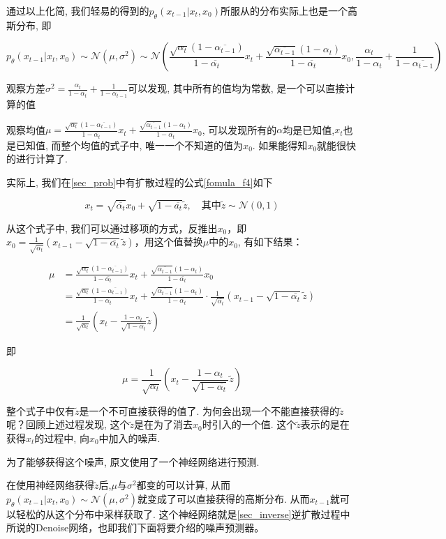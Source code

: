 通过以上化简, 我们轻易的得到的$p_\theta(x_{t-1}|x_t,x_0)$所服从的分布实际上也是一个高斯分布, 即

$$p_\theta(x_{t-1}|x_t,x_0)\sim\mathcal{N}(\mu,\sigma^2)\sim\mathcal{N}\left(\frac{\sqrt{\alpha_t}(1-\overline{\alpha_{t-1}})}{1-\overline{\alpha_t}}x_t+\frac{\sqrt{\overline{\alpha_{t-1}}}\left(1-\alpha_t\right)}{1-\overline{\alpha_t}}x_0, \frac{\alpha_t}{1-\alpha_t}+\frac{1}{1-\overline{\alpha_{t-1}}}\right)$$

观察方差$\sigma^2=\frac{\alpha_t}{1-\alpha_t}+\frac{1}{1-\overline{\alpha_{t-1}}}$可以发现, 其中所有的值均为常数, 是一个可以直接计算的值

观察均值$\mu=\frac{\sqrt{\alpha_t}(1-\overline{\alpha_{t-1}})}{1-\overline{\alpha_t}}x_t+\frac{\sqrt{\overline{\alpha_{t-1}}}\left(1-\alpha_t\right)}{1-\overline{\alpha_t}}x_0$, 可以发现所有的$\alpha$均是已知值,$x_t$也是已知值, 而整个均值的式子中, 唯一一个不知道的值为$x_0$. 如果能得知$x_0$就能很快的进行计算了.

实际上, 我们在\ref{sec_prob}中有扩散过程的公式\ref{fomula_f4}如下

$$x_t=\sqrt{\overline{\alpha_t}}x_0 + \sqrt{1-\overline{a_t}}\widetilde{z},\quad \text{其中}\widetilde{z}\sim\mathcal{N}(0,1)$$

从这个式子中, 我们可以通过移项的方式，反推出$x_0$，即$x_0 = \frac{1}{\sqrt{\overline{\alpha_t}}}\left(x_{t-1}-\sqrt{1-\overline{\alpha_t}}\widetilde{z}\right)$，用这个值替换$\mu$中的$x_0$, 有如下结果：


\begin{equation}
\begin{aligned}
\mu&=\frac{\sqrt{\alpha_t}(1-\overline{\alpha_{t-1}})}{1-\overline{\alpha_t}}x_t+\frac{\sqrt{\overline{\alpha_{t-1}}}\left(1-\alpha_t\right)}{1-\overline{\alpha_t}}x_0\\
&=\frac{\sqrt{\alpha_t}(1-\overline{\alpha_{t-1}})}{1-\overline{\alpha_t}}x_t+\frac{\sqrt{\overline{\alpha_{t-1}}}\left(1-\alpha_t\right)}{1-\overline{\alpha_t}}\cdot\frac{1}{\sqrt{\overline{\alpha_t}}}\left(x_{t-1}-\sqrt{1-\overline{\alpha_t}}\widetilde{z}\right)\\
&=\frac{1}{\sqrt{\alpha_t}}\left( x_t-\frac{1-\alpha_t}{\sqrt{1-\overline{\alpha_t}}}\widetilde{z} \right)
\end{aligned}
\end{equation}


即

$$
\mu=\frac{1}{\sqrt{\alpha_t}}\left( x_t-\frac{1-\alpha_t}{\sqrt{1-\overline{\alpha_t}}}\widetilde{z} \right)
$$

整个式子中仅有$\widetilde{z}$是一个不可直接获得的值了. 为何会出现一个不能直接获得的$\widetilde{z}$呢？回顾上述过程发现, 这个$\widetilde{z}$是在为了消去$x_0$时引入的一个值. 这个$\widetilde{z}$表示的是在获得$x_t$的过程中,  向$x_0$中加入的噪声. 

为了能够获得这个噪声, 原文使用了一个神经网络进行预测.

在使用神经网络获得$\widetilde{z}$后,$\mu$与$\sigma^2$都变的可以计算, 从而$p_\theta(x_{t-1}|x_t,x_0)\sim \mathcal{N}(\mu, \sigma^2)$就变成了可以直接获得的高斯分布. 从而$x_{t-1}$就可以轻松的从这个分布中采样获取了.
这个神经网络就是\ref{sec_inverse}逆扩散过程中所说的Denoise网络，也即我们下面将要介绍的噪声预测器。
